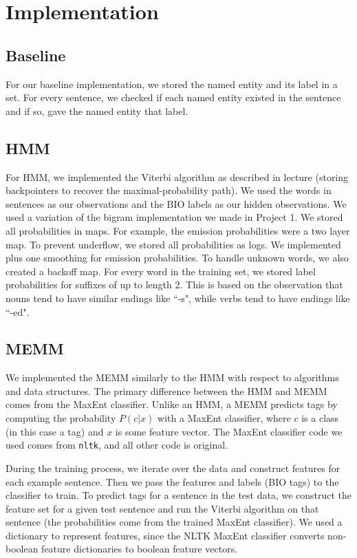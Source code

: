 \documentclass[12pt]{article}
\begin{document}
\maketitle


\section{Implementation}
\subsection{Baseline}
For our baseline implementation, we stored the named entity and its label in a set. For every sentence, we checked if each named entity existed in the sentence and if so, gave the named entity that label.
\subsection{HMM}
For HMM, we implemented the Viterbi algorithm as described in lecture (storing backpointers to recover the maximal-probability path). We used the words in sentences as our observations and the BIO labels as our hidden observations. We used a variation of the bigram implementation we made in Project 1. We stored all probabilities in maps. For example, the emission probabilities were a two layer map. To prevent underflow, we stored all probabilities as logs. We implemented plus one smoothing for emission probabilities. To handle unknown words, we also created a backoff map. For every word in the training set, we stored label probabilities for suffixes of up to length 2. This is based on the observation that nouns tend to have similar endings like ``-s", while verbs tend to have endings like ``-ed".
\subsection{MEMM}
We implemented the MEMM similarly to the HMM with respect to algorithms and data structures. The primary difference between the HMM and MEMM comes from the MaxEnt classifier. Unlike an HMM, a MEMM predicts tags by computing the probability $P(c|x)$ with a MaxEnt classifier, where $c$ is a class (in this case a tag) and $x$ is some feature vector. The MaxEnt classifier code we used comes from {\tt nltk}, and all other code is original.

During the training process, we iterate over the data and construct features for each example sentence. Then we pass the features and labels (BIO tags) to the classifier to train. To predict tags for a sentence in the test data, we construct the feature set for a given test sentence and run the Viterbi algorithm on that sentence (the probabilities come from the trained MaxEnt classifier). We used a dictionary to represent features, since the NLTK MaxEnt classifier converts non-boolean feature dictionaries to boolean feature vectors.
\end{document}
